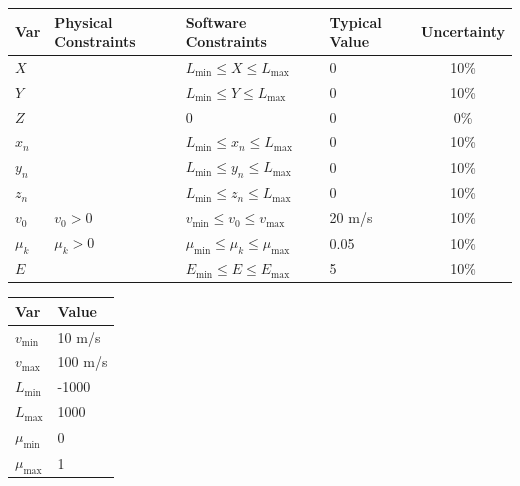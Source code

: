 \documentclass[12pt]{article}
\begin{document}
	\begin{table}[!h]
		\caption{Input Variables} \label{TblInputVar}
		\renewcommand{\arraystretch}{1.2}
		\noindent \begin{longtable*}{l l l l c} 
			\toprule
			\textbf{Var} & \textbf{Physical Constraints} & \textbf{Software Constraints} &
			\textbf{Typical Value} & \textbf{Uncertainty}\\
			\midrule 
			$X$ &  & $L_{\text{min}} \leq X \leq L_{\text{max}}$ & 0 & 10\%
			\\
			$Y$ &  & $L_{\text{min}} \leq Y \leq L_{\text{max}}$ & 0 & 10\%
			\\
			$Z$ &  & $0$ & 0 & 0\%
			\\
			$x_{n}$ &  & $L_{\text{min}} \leq x_{n} \leq L_{\text{max}}$ & 0 & 10\%
			\\
			$y_{n}$ &  & $L_{\text{min}} \leq y_{n} \leq L_{\text{max}}$ & 0 & 10\%
			\\
			$z_{n}$ &  & $L_{\text{min}} \leq z_{n} \leq L_{\text{max}}$ & 0 & 10\%
			\\
			$v_{0}$ & $v_{0} > 0$ & $v_{\text{min}} \leq v_{0} \leq v_{\text{max}}$ & 20 m/s & 10\%
			\\
			$\mu_{k}$ & $\mu_{k} > 0$ & $\mu_{\text{min}} \leq \mu_{k} \leq \mu_{\text{max}}$ & 0.05 & 10\%
			\\
			$E$ &  & $E_{\text{min}} \leq E \leq E_{\text{max}}$ & 5 & 10\%
			\\
			\bottomrule
		\end{longtable*}
	\end{table}
	
	\noindent 
	
	\begin{table}[!h]
		\caption{Specification Parameter Values} \label{TblSpecParams}
		\renewcommand{\arraystretch}{1.2}
		\noindent \begin{longtable*}{l l} 
			\toprule
			\textbf{Var} & \textbf{Value} \\
			\midrule 
			$v_\text{min}$ & 10 m/s\\
			$v_\text{max}$ & 100 m/s\\
			$L_\text{min}$ & -1000\\
			$L_\text{max}$ & 1000\\
			$\mu_\text{min}$ & 0\\
			$\mu_\text{max}$ & 1\\
			\bottomrule
		\end{longtable*}
	\end{table}
	
\end{document}
